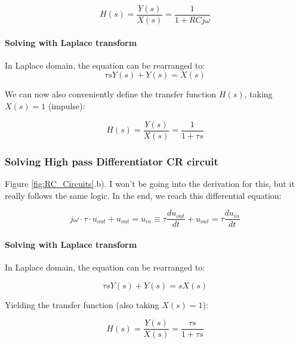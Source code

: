 \begin{equation}
    H(s) = \frac{Y(s)}{X(s)} = \frac{1}{1 + RCj \omega }
\end{equation}

\paragraph{Solving with Laplace transform}

In Laplace domain, the equation can be rearranged to: 
\begin{equation}
    \tau s Y(s) + Y(s) = X(s)
\end{equation}

We can now also conveniently define the transfer function $H(s)$, taking $X(s) = 1$ (impulse): 

\begin{equation}
    H(s) = \frac{Y(s)}{X(s)} = \frac{1}{1 + \tau s}
\end{equation}


\subsubsection{Solving High pass Differentiator CR circuit} 

Figure \ref{fig:RC_Circuits}.b). I won't be going into the derivation for this, but it really follows the same logic. In the end, we reach this differential equation: 

\begin{equation}
    j \omega \cdot \tau \cdot u_{out} + u_{out} = u_{in} \equiv \tau \frac{du_{out}}{dt} + u_{out} = \tau\frac{d u_{in}}{dt}
\end{equation}

\paragraph{Solving with Laplace transform}

In Laplace domain, the equation can be rearranged to: 

\begin{equation}
    \tau s Y(s) + Y(s) = sX(s)
\end{equation}

Yielding the transfer function (also taking $X(s) = 1$): 

\begin{equation}
    H(s) = \frac{Y(s)}{X(s)} = \frac{\tau s}{1 + \tau s }
\end{equation}

